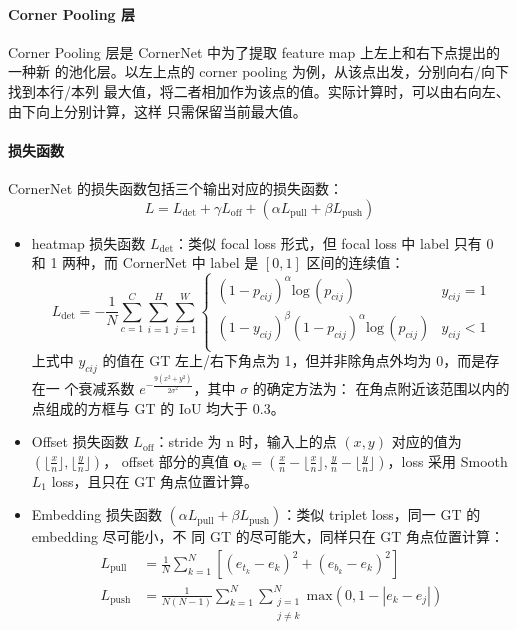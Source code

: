 \paragraph{Corner Pooling 层}
Corner Pooling 层是 CornerNet 中为了提取 feature map 上左上和右下点提出的一种新
的池化层。以左上点的 corner pooling 为例，从该点出发，分别向右/向下找到本行/本列
最大值，将二者相加作为该点的值。实际计算时，可以由右向左、由下向上分别计算，这样
只需保留当前最大值。

\paragraph{损失函数}
CornerNet 的损失函数包括三个输出对应的损失函数：
\begin{equation}
  \label{eq:cornernet-loss}
  L = L_{\mathrm{det}} + \gamma L_{\mathrm{off}} + (\alpha L_{\mathrm{pull}} + \beta L_{\mathrm{push}})
\end{equation}

\begin{itemize}
  \item heatmap 损失函数 $L_{\mathrm{det}}$：类似 focal loss 形式，但 focal loss
    中 label 只有 0 和 1 两种，而 CornerNet 中 label 是 $[0, 1]$ 区间的连续值：
    \begin{equation}
      \label{equ:cornernet-det-loss}
      L_{\mathrm{det}} = -\frac{1}{N} \sum_{c=1}^{C} \sum_{i=1}^{H} \sum_{j=1}^{W}
      \left\{
        \begin{array}{lr}
           (1-p_{cij})^{\alpha}\mathrm{log}\,(p_{cij}) & y_{cij} = 1 \\
           (1-y_{cij})^{\beta} (1-p_{cij})^{\alpha} \mathrm{log}\,(p_{cij}) & y_{cij} < 1 \\
        \end{array}
      \right.
    \end{equation}
    上式中 $y_{cij}$ 的值在 GT 左上/右下角点为 1，但并非除角点外均为 0，而是存在一
    个衰减系数 $e^{-\frac{9(x^2+y^2)}{2\sigma^2}}$，其中 $\sigma$ 的确定方法为：
    在角点附近该范围以内的点组成的方框与 GT 的 IoU 均大于 0.3。
  \item Offset 损失函数 $L_{\mathrm{off}}$：stride 为 n 时，输入上的点 $(x, y)$
    对应的值为 $( \lfloor \frac{x}{n} \rfloor, \lfloor \frac{y}{n} \rfloor)$，
    offset 部分的真值 $\mathbf{o}_k = \left( \frac{x}{n} - \lfloor \frac{x}{n}
      \rfloor, \frac{y}{n} - \lfloor \frac{y}{n} \rfloor \right)$，loss 采用
    Smooth $L_1$ loss，且只在 GT 角点位置计算。
  \item Embedding 损失函数 $(\alpha L_{\mathrm{pull}} + \beta
    L_{\mathrm{push}})$：类似 triplet loss，同一 GT 的 embedding 尽可能小，不
    同 GT 的尽可能大，同样只在 GT 角点位置计算：
    \begin{align}
      \label{equ:cornernet-em-loss-pull}
      L_{\mathrm{pull}} & = \frac{1}{N} \sum_{k=1}^{N} \left[ (e_{t_k} - e_k)^2 + (e_{b_k} - e_k)^2 \right] \\
      \label{equ:cornernet-em-loss-push}
      L_{\mathrm{push}} & = \frac{1}{N(N-1)} \sum_{k=1}^{N} \sum_{\substack{j=1 \\ j \neq k}}^{N} \mathrm{max} (0, 1-|e_k-e_j|)
    \end{align}
\end{itemize}


